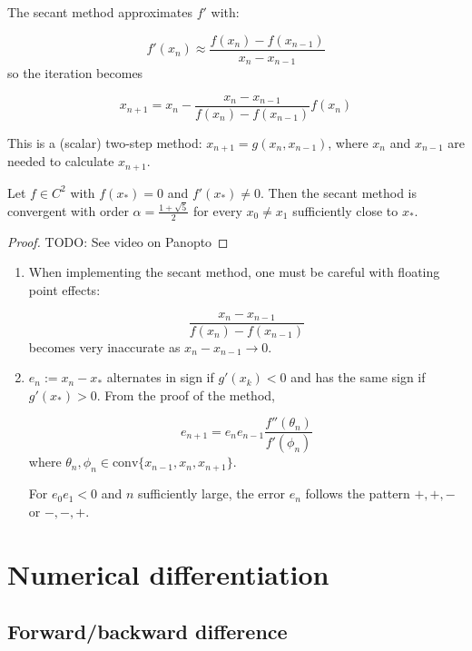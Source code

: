 The secant method approximates $f'$ with:

\[ f'(x_n) \approx \frac{f(x_n) - f(x_{n - 1})}{x_n - x_{n - 1}} \]
so the iteration becomes

\[ x_{n + 1} = x_n - \frac{x_n - x_{n - 1}}{f(x_n) - f(x_{n - 1})} f(x_n) \]

\begin{remark}
	This is a (scalar) two-step method: $x_{n + 1} = g(x_n, x_{n - 1})$, where $x_n$ and $x_{n - 1}$ are needed to calculate $x_{n + 1}$.
\end{remark}

\begin{theorem}
	Let $f \in C^2$ with $f(x_*) = 0$ and $f'(x_*) \ne 0$. Then the secant method is convergent with order $\alpha = \frac{1 + \sqrt{5}}{2}$ for every $x_0 \ne x_1$ sufficiently close to $x_*$.
\end{theorem}

\begin{proof}
	TODO: See video on Panopto
\end{proof}

\begin{remark}
	\hfill
	\begin{enumerate}
		\item When implementing the secant method, one must be careful with floating point effects:

		\[ \frac{x_n - x_{n - 1}}{f(x_n) - f(x_{n - 1})} \]
		becomes very inaccurate as $x_n - x_{n - 1} \rightarrow 0$.
		\item $e_n := x_n - x_*$ alternates in sign if $g'(x_k) < 0$ and has the same sign if $g'(x_*) > 0$. From the proof of the method,
		
		\[ e_{n + 1} = e_n e_{n - 1} \frac{f''(\theta_n)}{f'(\phi_n)} \]
		where $\theta_n, \phi_n \in \text{conv} \{x_{n - 1}, x_n, x_{n + 1} \}$.

		For $e_0 e_1 < 0$ and $n$ sufficiently large, the error $e_n$ follows the pattern $+,+,-$ or $-,-,+$.
	\end{enumerate}
\end{remark}

\clearpage
\section{Numerical differentiation}

\subsection{Forward/backward difference}

